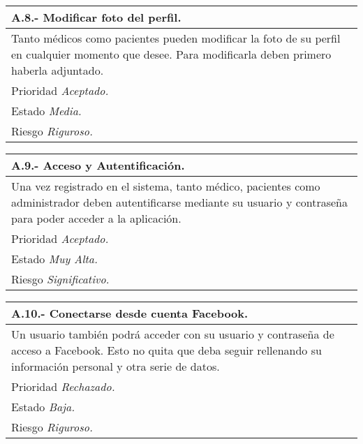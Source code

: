	\begin{center}
	\begin{tabulary}{15cm}{|L|}
		\hline
			\bf{A.8.- Modificar foto del perfil.} \\
		\hline
			Tanto médicos como pacientes pueden modificar la foto de su perfil en cualquier momento que desee. Para modificarla deben primero haberla adjuntado. \\
		\hline
			Prioridad \textit{Aceptado.} \\
		\hline
			Estado \textit{Media.} \\
		\hline
			Riesgo \textit{Riguroso.} \\
		\hline
	\end{tabulary}
	\end{center}

	\begin{center}
	\begin{tabulary}{15cm}{|L|}
		\hline
			\bf{A.9.- Acceso y Autentificación.} \\
		\hline
			Una vez registrado en el sistema, tanto médico, pacientes como administrador deben autentificarse mediante su usuario y contraseña para poder acceder a la aplicación. \\
		\hline
			Prioridad \textit{Aceptado.} \\
		\hline
			Estado \textit{Muy Alta.} \\
		\hline
			Riesgo \textit{Significativo.} \\
		\hline
	\end{tabulary}
	\end{center}

	\begin{center}
	\begin{tabulary}{15cm}{|L|}
		\hline
			\bf{A.10.- Conectarse desde cuenta Facebook.} \\
		\hline
			Un usuario también podrá acceder con su usuario y contraseña de acceso a Facebook. Esto no quita que deba seguir rellenando su información personal y otra serie de datos. \\
		\hline
			Prioridad \textit{Rechazado.} \\
		\hline
			Estado \textit{Baja.} \\
		\hline
			Riesgo \textit{Riguroso.} \\
		\hline
	\end{tabulary}
	\end{center}


